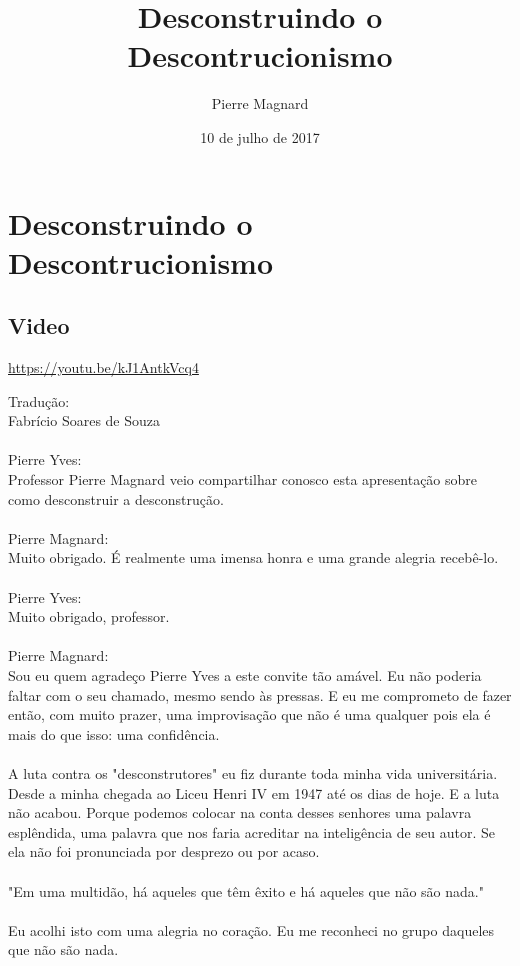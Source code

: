 \documentclass[10pt,a4paper]{book}
\title{Desconstruindo o Descontrucionismo}
\author{Pierre Magnard}
\date{10 de julho de 2017}
\begin{document}
	\maketitle
	
	\chapter{Desconstruindo o Descontrucionismo}	
	\section{Video}
	
	\url{https://youtu.be/kJ1AntkVcq4}
	
	Tradução:\\
	Fabrício Soares de Souza\\
	\\
	Pierre Yves:\\
	Professor Pierre Magnard veio compartilhar conosco esta apresentação sobre como desconstruir a desconstrução.\\
	\\
	Pierre Magnard:\\
	Muito obrigado. É realmente uma imensa honra e uma grande alegria recebê-lo.\\
	\\
	Pierre Yves:\\
	Muito obrigado, professor.\\
	\\
	Pierre Magnard: \\
	Sou eu quem agradeço Pierre Yves a este  convite tão amável. Eu não poderia faltar com o seu chamado, mesmo sendo às pressas. E eu me comprometo de fazer então, com muito prazer, uma improvisação que não é uma qualquer pois ela é mais do que isso: uma confidência.\\
	\\
	A luta contra os "desconstrutores" eu fiz durante toda minha vida universitária. Desde a minha chegada ao Liceu Henri IV em 1947 até os dias de hoje. E a luta não acabou. Porque podemos colocar na conta desses senhores uma palavra esplêndida, uma palavra que nos faria acreditar na inteligência de seu autor. Se ela não foi pronunciada por desprezo ou por acaso.\\
	\\
	"Em uma multidão, há aqueles que têm êxito e há aqueles que não são nada."\\
	\\
	Eu acolhi isto com uma alegria no coração. Eu me reconheci no grupo daqueles que não são nada. \\
\end{document}
